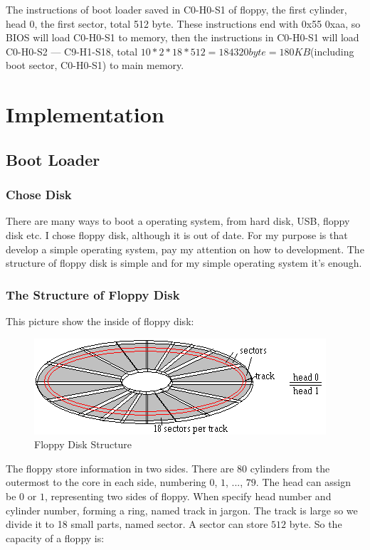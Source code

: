 \documentclass{swfcthesisp}
\begin{document}
The instructions of boot loader saved in C0-H0-S1 of floppy, the first cylinder, head 0,
the first sector, total 512 byte. These instructions end with 0x55 0xaa, so BIOS will load
C0-H0-S1 to memory, then the instructions in C0-H0-S1 will load C0-H0-S2 --- C9-H1-S18,
total $10*2*18*512=184320byte=180KB$(including boot sector, C0-H0-S1) to main memory.



\chapter{Implementation}

\section{Boot Loader}

\subsection{Chose Disk}
\label{sec:chose-disk}

There are many ways to boot a operating system, from hard disk, USB, floppy disk etc. I
chose floppy disk, although it is out of date. For my purpose is that develop a simple
operating system, pay my attention on how to development. The structure of floppy disk is
simple and for my simple operating system it's enough.

\subsection{The Structure of Floppy Disk}
\label{sec:struct-floppy-disk}

This picture show the inside of floppy disk:
\begin{figure}[!ht]
  \centering
  \includegraphics[width=.5\textwidth]{../figs/bootLoader/flpy1.png}
  \caption{Floppy Disk Structure}
  \label{fig:flpy1.png}
\end{figure}

The floppy store information in two sides. There are $80$ cylinders from the outermost to
the core in each side, numbering $0$, $1$, ..., $79$. The head can assign be $0$ or $1$,
representing two sides of floppy. When specify head number and cylinder number, forming a
ring, named track in jargon. The track is large so we divide it to 18 small parts, named
sector. A sector can store $512$ byte. So the capacity of a floppy is:
\end{document}
